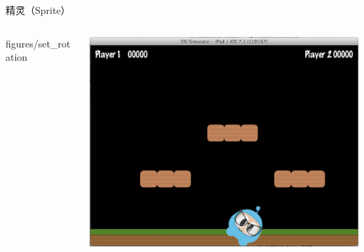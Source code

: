 \documentclass{beamer}
\begin{document}
\begin{frame}[fragile]{精灵（Sprite）}
\begin{columns}
\begin{column}{0.3\textwidth}
{figures/set_rotation}
\end{column}
\begin{column}{0.3\textwidth}
\includegraphics[width=\textwidth]
{figures/set_scale}
\end{column}
\end{columns}
\end{frame}

\end{document}
